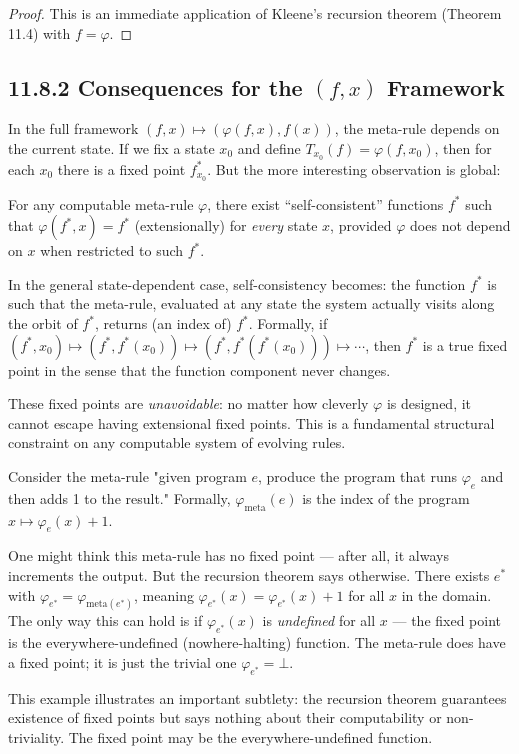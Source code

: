 \begin{proof}
This is an immediate application of Kleene's recursion theorem (Theorem 11.4) with $f = \varphi$. 

\end{proof}

\subsection{11.8.2 Consequences for the $(f, x)$ Framework}

In the full framework $(f, x) \mapsto (\varphi(f, x), f(x))$, the meta-rule depends on the current state. If we fix a state $x_0$ and define $T_{x_0}(f) = \varphi(f, x_0)$, then for each $x_0$ there is a fixed point $f^*_{x_0}$. But the more interesting observation is global:

\begin{observation}
For any computable meta-rule $\varphi$, there exist ``self-consistent'' functions $f^*$ such that $\varphi(f^*, x) = f^*$ (extensionally) for \textit{every} state $x$, provided $\varphi$ does not depend on $x$ when restricted to such $f^*$.

In the general state-dependent case, self-consistency becomes: the function $f^*$ is such that the meta-rule, evaluated at any state the system actually visits along the orbit of $f^*$, returns (an index of) $f^*$. Formally, if $(f^*, x_0) \mapsto (f^*, f^*(x_0)) \mapsto (f^*, f^*(f^*(x_0))) \mapsto \cdots$, then $f^*$ is a true fixed point in the sense that the function component never changes.

These fixed points are \textit{unavoidable}: no matter how cleverly $\varphi$ is designed, it cannot escape having extensional fixed points. This is a fundamental structural constraint on any computable system of evolving rules.
\end{observation}

\begin{example}
Consider the meta-rule "given program $e$, produce the program that runs $\varphi_e$ and then adds 1 to the result." Formally, $\varphi_{\text{meta}}(e)$ is the index of the program $x \mapsto \varphi_e(x) + 1$.

One might think this meta-rule has no fixed point --- after all, it always increments the output. But the recursion theorem says otherwise. There exists $e^*$ with $\varphi_{e^*} = \varphi_{\text{meta}(e^*)}$, meaning $\varphi_{e^*}(x) = \varphi_{e^*}(x) + 1$ for all $x$ in the domain. The only way this can hold is if $\varphi_{e^*}(x)$ is \textit{undefined} for all $x$ --- the fixed point is the everywhere-undefined (nowhere-halting) function. The meta-rule does have a fixed point; it is just the trivial one $\varphi_{e^*} = \bot$.

This example illustrates an important subtlety: the recursion theorem guarantees existence of fixed points but says nothing about their computability or non-triviality. The fixed point may be the everywhere-undefined function.
\end{example}

